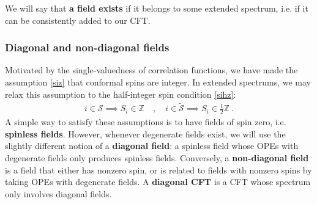 \documentclass[12pt, a4paper]{article}
\theoremstyle{break}
\begin{document}
We will say that \textbf{a field exists} if it belongs to some extended spectrum, i.e. if it can be consistently added to our CFT. 

\subsubsection{Diagonal and non-diagonal fields}

Motivated by the single-valuedness of correlation functions, we have made the assumption \eqref{siz} that conformal spins are integer. In extended spectrums, we may relax this assumption to the half-integer spin condition \eqref{sihz}:
\begin{align}
 i\in\mathcal{S}\implies S_i\in\mathbb{Z} \quad , \quad i \in \widetilde{\mathcal{S}}\implies S_i\in\frac12\mathbb{Z}\ . 
\end{align}
A simple way to satisfy these assumptions is to have fields of spin zero, i.e. \textbf{spinless fields}. However, whenever degenerate fields exist, we will use the slightly different notion of a \textbf{diagonal field}: a spinless field whose OPEs with degenerate fields only produces spinless fields. Conversely, a \textbf{non-diagonal field} is a field that either has nonzero spin, or is related to fields with nonzero spins by taking OPEs with degenerate fields. A \textbf{diagonal CFT} is a CFT whose spectrum only involves diagonal fields.  
\end{document}
